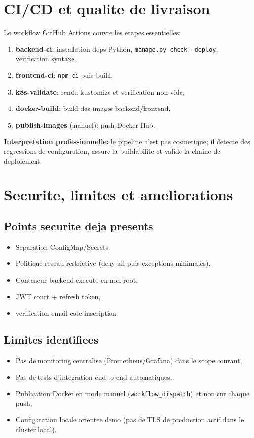 \documentclass[11pt,a4paper]{article}
\begin{document}
\section{CI/CD et qualite de livraison}

Le workflow GitHub Actions couvre les etapes essentielles:
\begin{enumerate}
  \item \textbf{backend-ci}: installation deps Python, \texttt{manage.py check --deploy}, verification syntaxe,
  \item \textbf{frontend-ci}: \texttt{npm ci} puis build,
  \item \textbf{k8s-validate}: rendu kustomize et verification non-vide,
  \item \textbf{docker-build}: build des images backend/frontend,
  \item \textbf{publish-images} (manuel): push Docker Hub.
\end{enumerate}

\textbf{Interpretation professionnelle:} le pipeline n'est pas cosmetique; il detecte des regressions de configuration,
assure la buildabilite et valide la chaine de deploiement.

\section{Securite, limites et ameliorations}

\subsection{Points securite deja presents}
\begin{itemize}
  \item Separation ConfigMap/Secrets,
  \item Politique reseau restrictive (deny-all puis exceptions minimales),
  \item Conteneur backend execute en non-root,
  \item JWT court + refresh token,
  \item verification email cote inscription.
\end{itemize}

\subsection{Limites identifiees}
\begin{itemize}
  \item Pas de monitoring centralise (Prometheus/Grafana) dans le scope courant,
  \item Pas de tests d'integration end-to-end automatiques,
  \item Publication Docker en mode manuel (\texttt{workflow\_dispatch}) et non sur chaque push,
  \item Configuration locale orientee demo (pas de TLS de production actif dans le cluster local).
\end{itemize}
\end{document}
